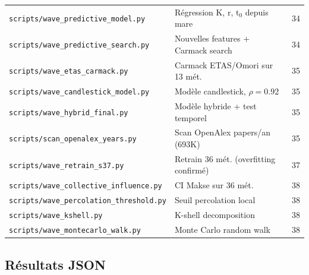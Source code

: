 \documentclass[11pt,a4paper]{article}
\begin{document}
\begin{center}
\begin{tabular}{lll}
\texttt{scripts/wave\_predictive\_model.py} & R\'egression K, r, t$_0$ depuis mare & 34 \\
\texttt{scripts/wave\_predictive\_search.py} & Nouvelles features + Carmack search & 34 \\
\texttt{scripts/wave\_etas\_carmack.py} & Carmack ETAS/Omori sur 13 m\'et. & 35 \\
\texttt{scripts/wave\_candlestick\_model.py} & Mod\`ele candlestick, $\rho = 0.92$ & 35 \\
\texttt{scripts/wave\_hybrid\_final.py} & Mod\`ele hybride + test temporel & 35 \\
\texttt{scripts/scan\_openalex\_years.py} & Scan OpenAlex papers/an (693K) & 35 \\
\texttt{scripts/wave\_retrain\_s37.py} & Retrain 36 m\'et. (overfitting confirm\'e) & 37 \\
\texttt{scripts/wave\_collective\_influence.py} & CI Makse sur 36 m\'et. & 38 \\
\texttt{scripts/wave\_percolation\_threshold.py} & Seuil percolation local & 38 \\
\texttt{scripts/wave\_kshell.py} & K-shell decomposition & 38 \\
\texttt{scripts/wave\_montecarlo\_walk.py} & Monte Carlo random walk & 38 \\
\bottomrule
\end{tabular}
\end{center}

\subsection{R\'esultats JSON}
\end{document}
